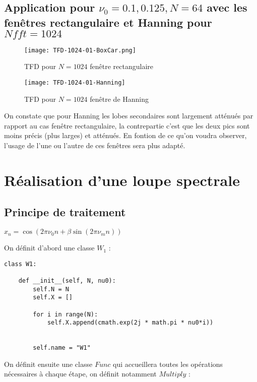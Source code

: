 \documentclass{article}
\begin{document}
\subsection{Application pour $\nu_{0}=0.1, 0.125, N=64$ avec les fenêtres rectangulaire et Hanning pour   $Nfft=1024$}

\begin{figure}[h!]
    \begin{minipage}[c]{.46\linewidth}
        \centering
        \texttt{[image: TFD-1024-01-BoxCar.png]}
        \caption{TFD pour $N=1024$ fenêtre rectangulaire}
    \end{minipage}
    \hfill%
    \begin{minipage}[c]{.46\linewidth}
        \centering
        \texttt{[image: TFD-1024-01-Hanning]}
        \caption{TFD pour $N=1024$ fenêtre de Hanning}
    \end{minipage}
\end{figure}

On constate que pour Hanning les lobes secondaires sont largement atténués par rapport au cas fenêtre rectangulaire, la contrepartie c'est que les deux pics sont moins précis (plus larges) et atténués. En fontion de ce qu'on voudra observer, l'usage de l'une ou l'autre de ces fenêtres sera plus adapté.

\section{Réalisation d'une loupe spectrale}
\subsection{Principe de traitement}
$x_{n}=\cos(2\pi\nu_{0}n+\beta\sin(2\pi\nu_{m}n))$

On définit d'abord une classe $W_{1}$ :

\begin{lstlisting}
class W1:

    def __init__(self, N, nu0):
        self.N = N
        self.X = []

        for i in range(N):
            self.X.append(cmath.exp(2j * math.pi * nu0*i))


        self.name = "W1"
\end{lstlisting}

On définit ensuite une classe $Func$ qui accueillera toutes les opérations nécessaires à chaque étape, on  définit notamment $Multiply$ : 
\end{document}
